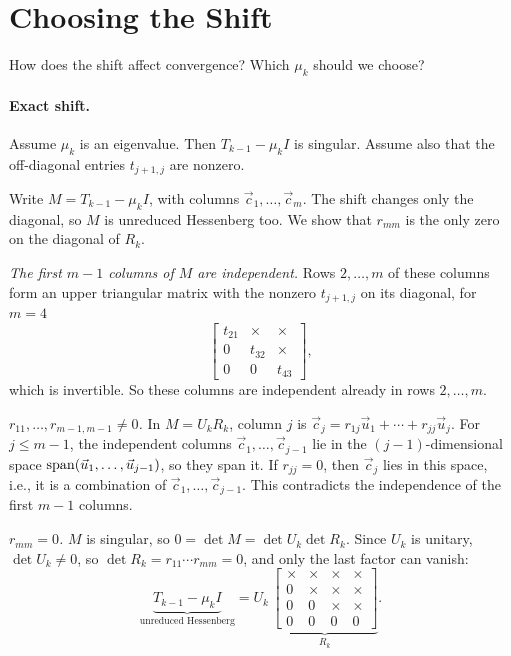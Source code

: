 \section{Choosing the Shift}
\label{sec:choosing-shift}

How does the shift affect convergence? Which $\mu_k$ should we choose?

\paragraph{Exact shift.} Assume $\mu_k$ is an eigenvalue. Then $T_{k-1} - \mu_kI$ is singular. Assume also that the off-diagonal entries $t_{j+1,j}$ are nonzero.

Write $M = T_{k-1} - \mu_kI$, with columns $\vec{c}_1, \dots, \vec{c}_m$. The shift changes only the diagonal, so $M$ is unreduced Hessenberg too. We show that $r_{mm}$ is the only zero on the diagonal of $R_k$.

\emph{The first $m - 1$ columns of $M$ are independent.} Rows $2, \dots, m$ of these columns form an upper triangular matrix with the nonzero $t_{j+1,j}$ on its diagonal, for $m = 4$
\begin{equation*}
  \begin{bmatrix} t_{21} & \times & \times \\ 0 & t_{32} & \times \\ 0 & 0 & t_{43} \end{bmatrix},
\end{equation*}
which is invertible. So these columns are independent already in rows $2, \dots, m$.

\emph{$r_{11}, \dots, r_{m-1,m-1} \ne 0$.} In $M = U_kR_k$, column $j$ is $\vec{c}_j = r_{1j}\vec{u}_1 + \cdots + r_{jj}\vec{u}_j$. For $j \le m - 1$, the independent columns $\vec{c}_1, \dots, \vec{c}_{j-1}$ lie in the $(j-1)$-dimensional space $\operatorname{span}(\vec{u}_1, \dots, \vec{u}_{j-1})$, so they span it. If $r_{jj} = 0$, then $\vec{c}_j$ lies in this space, i.e., it is a combination of $\vec{c}_1, \dots, \vec{c}_{j-1}$. This contradicts the independence of the first $m - 1$ columns.

\emph{$r_{mm} = 0$.} $M$ is singular, so $0 = \det M = \det U_k\det R_k$. Since $U_k$ is unitary, $\det U_k \ne 0$, so $\det R_k = r_{11}\cdots r_{mm} = 0$, and only the last factor can vanish:
\begin{equation}
  \underbrace{T_{k-1} - \mu_kI}_{\text{unreduced Hessenberg}} = U_k\,\underbrace{\begin{bmatrix} \times & \times & \times & \times \\ 0 & \times & \times & \times \\ 0 & 0 & \times & \times \\ 0 & 0 & 0 & 0 \end{bmatrix}}_{R_k}.
\end{equation}

